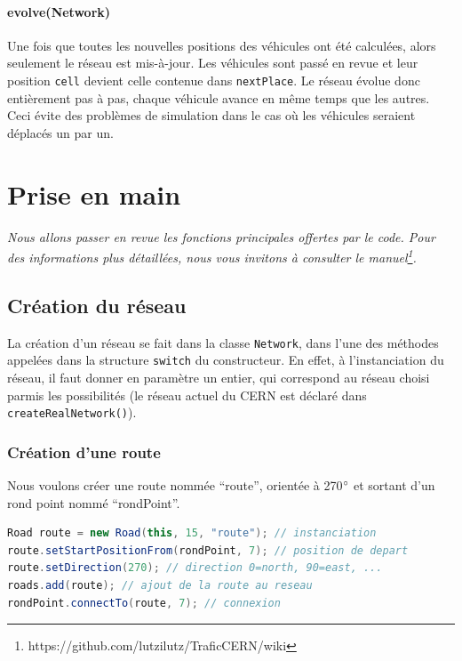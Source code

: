 \documentclass[a4paper,11pt, titlepage]{extarticle}
\begin{document}
\paragraph{evolve(Network)}

Une fois que toutes les nouvelles positions des véhicules ont été calculées, alors seulement le réseau est mis-à-jour. Les véhicules sont passé en revue et leur position \texttt{cell} devient celle contenue dans \texttt{nextPlace}. Le réseau évolue donc entièrement pas à pas, chaque véhicule avance en même temps que les autres. Ceci évite des problèmes de simulation dans le cas où les véhicules seraient déplacés un par un.

\newpage

\section{Prise en main}

\emph{Nous allons passer en revue les fonctions principales offertes par le code. Pour des informations plus détaillées, nous vous invitons à consulter le manuel\footnote{https://github.com/lutzilutz/TraficCERN/wiki}.}\newline

\subsection{Création du réseau}

La création d'un réseau se fait dans la classe \texttt{Network}, dans l'une des méthodes appelées dans la structure \texttt{switch} du constructeur. En effet, à l'instanciation du réseau, il faut donner en paramètre un entier, qui correspond au réseau choisi parmis les possibilités (le réseau actuel du CERN est déclaré dans \texttt{createRealNetwork()}).

\subsubsection{Création d'une route}

Nous voulons créer une route nommée ``route'', orientée à 270$\degree$ et sortant d'un rond point nommé ``rondPoint''.

\begin{lstlisting}[language=Java]
Road route = new Road(this, 15, "route"); // instanciation
route.setStartPositionFrom(rondPoint, 7); // position de depart
route.setDirection(270); // direction 0=north, 90=east, ...
roads.add(route); // ajout de la route au reseau
rondPoint.connectTo(route, 7); // connexion
\end{lstlisting}
\end{document}
